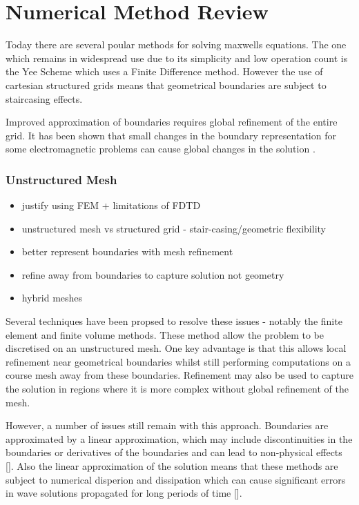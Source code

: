 \chapter{Numerical Method Review}
\label{NumericalMethodsChapter}

Today there are several poular methods for solving maxwells equations. The one which remains in widespread use due to its simplicity and low operation count is the Yee Scheme \cite{YeeScheme} which uses a Finite Difference method. However the use of cartesian structured grids means that geometrical boundaries are subject to staircasing effects.


Improved approximation of boundaries requires global refinement of the entire grid. It has been shown that small changes in the boundary representation for some electromagnetic problems can cause global changes in the solution \cite{RubenNEFEM}.

\subsection{Unstructured Mesh}
\begin{itemize}
  \item justify using FEM + limitations of FDTD
  \item unstructured mesh vs structured grid - stair-casing/geometric flexibility
  \item better represent boundaries with mesh refinement
  \item refine away from boundaries to capture solution not geometry
  \item hybrid meshes
\end{itemize}

Several techniques have been propsed to resolve these issues - notably the finite element and finite volume methods. These method allow the problem to be discretised on an unstructured mesh. One key advantage is that this allows local refinement near geometrical boundaries whilst still performing computations on a course mesh away from these boundaries. Refinement may also be used to capture the solution in regions where it is more complex without global refinement of the mesh.

However, a number of issues still remain with this approach. Boundaries are approximated by a linear approximation, which may include discontinuities in the boundaries or derivatives of the boundaries and can lead to non-physical effects []. Also the linear approximation of the solution means that these methods are subject to numerical disperion and dissipation which can cause significant errors in wave solutions propagated for long periods of time [].

